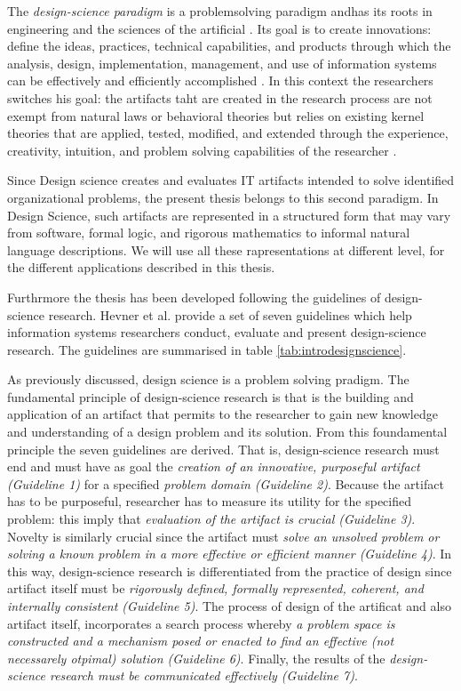 \documentclass[]{book}
\begin{document}
The \emph{design-science paradigm} is a problemsolving paradigm andhas
its roots in engineering and the sciences of the artificial
\citep{simon1996sciences}. Its goal is to create innovations: define the
ideas, practices, technical capabilities, and products through which the
analysis, design, implementation, management, and use of information
systems can be effectively and efficiently accomplished
\citep{denning1997new, tsichritzis1997dynamics}. In this context the
researchers switches his goal: the artifacts taht are created in the
research process are not exempt from natural laws or behavioral theories
but relies on existing kernel theories that are applied, tested,
modified, and extended through the experience, creativity, intuition,
and problem solving capabilities of the researcher
\citep{markus2002design, walls1992building}.

Since Design science creates and evaluates IT artifacts intended to
solve identified organizational problems, the present thesis belongs to
this second paradigm. In Design Science, such artifacts are represented
in a structured form that may vary from software, formal logic, and
rigorous mathematics to informal natural language descriptions. We will
use all these rapresentations at different level, for the different
applications described in this thesis.

Furthrmore the thesis has been developed following the guidelines of
design-science research. Hevner et al. \citep{bichler2006design} provide
a set of seven guidelines which help information systems researchers
conduct, evaluate and present design-science research. The guidelines
are summarised in table \ref{tab:introdesignscience}.

As previously discussed, design science is a problem solving pradigm.
The fundamental principle of design-science research is that is the
building and application of an artifact that permits to the researcher
to gain new knowledge and understanding of a design problem and its
solution. From this foundamental principle the seven guidelines are
derived. That is, design-science research must end and must have as goal
the \emph{creation of an innovative, purposeful artifact (Guideline 1)}
for a specified \emph{problem domain (Guideline 2)}. Because the
artifact has to be purposeful, researcher has to measure its utility for
the specified problem: this imply that \emph{evaluation of the artifact
is crucial (Guideline 3)}. Novelty is similarly crucial since the
artifact must \emph{solve an unsolved problem or solving a known problem
in a more effective or efficient manner (Guideline 4)}. In this way,
design-science research is differentiated from the practice of design
since artifact itself must be \emph{rigorously defined, formally
represented, coherent, and internally consistent (Guideline 5)}. The
process of design of the artificat and also artifact itself,
incorporates a search process whereby \emph{a problem space is
constructed and a mechanism posed or enacted to find an effective (not
necessarely otpimal) solution (Guideline 6)}. Finally, the results of
the \emph{design-science research must be communicated effectively
(Guideline 7)}.
\end{document}
